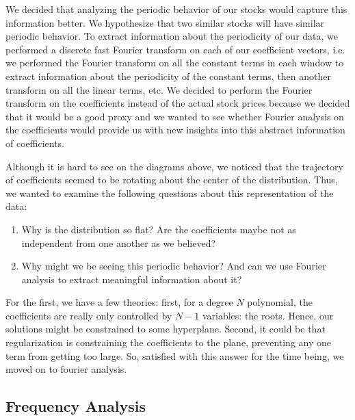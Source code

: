 \documentclass[final]{article}
\begin{document}
We decided that analyzing the periodic behavior of our stocks would capture
this information better. We hypothesize that two similar stocks will have
similar periodic behavior. To extract information about the periodicity of our
data, we performed a discrete fast Fourier transform on each of our coefficient
vectors, i.e. we performed the Fourier transform on all the constant terms in
each window to extract information about the periodicity of the constant terms,
then another transform on all the linear terms, etc. We decided to perform the
Fourier transform on the coefficients instead of the actual stock prices
because we decided that it would be a good proxy and we wanted to see whether
Fourier analysis on the coefficients would provide us with new insights into
this abstract information of coefficients.

Although it is hard to see on the diagrams above, we noticed that the
trajectory of coefficients seemed to be rotating about the center of
the distribution. Thus, we wanted to examine the following questions
about this representation of the data:
\begin{enumerate}
  \item Why is the distribution so flat? Are the coefficients maybe
    not as independent from one another as we believed?
  \item Why might we be seeing this periodic behavior? And can we use
    Fourier analysis to extract meaningful information about it?
\end{enumerate}
For the first, we have a few theories: first, for a degree $N$
polynomial, the coefficients are really only controlled by $N-1$
variables: the roots. Hence, our solutions might be constrained to
some hyperplane. Second, it could be that regularization is
constraining the coefficients to the plane, preventing any one term
from getting too large. So, satisfied with this answer for the time
being, we moved on to fourier analysis.

\subsection{Frequency Analysis}
\end{document}
